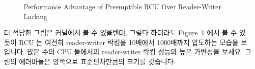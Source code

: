 \begin{figure}[tb]
\begin{center}
\end{center}
\caption{Performance Advantage of Preemptible RCU Over Reader-Writer Locking}
\label{fig:defer:Performance Advantage of Preemptible RCU Over Reader-Writer Locking}
\end{figure}

더 적당한 그림은  커널에서 볼 수 있을텐데, 그렇다 하더라도
Figure~\ref{fig:defer:Performance Advantage of Preemptible RCU Over Reader-Writer Locking}
에서 볼 수 있듯이 RCU 는 여전히 reader-writer 락킹을 10배에서 1000배까지
압도하는 모습을 보입니다.
많은 수의 CPU 들에서의 reader-writer 락킹 성능의 높은 가변성을 보세요.
그림의 에러바들은 양쪽으로 표준편차만큼의 크기를 갖습니다.


